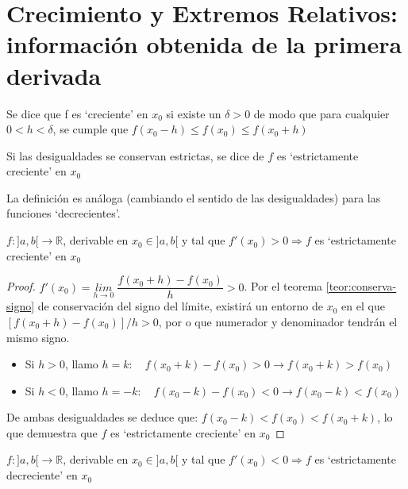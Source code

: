 \section[Crecimiento y Extremos Relativos: información obtenida de la primera derivada]{Crecimiento y Extremos Relativos: información obtenida de la primera derivada}

\label{ExtremosRelativos}

	\begin{defi}
		Se dice que f es `creciente' en $x_0$ si existe un $\delta>0$ de modo que para cualquier $0<h<\delta$, se cumple que $f(x_0-h)\le f(x_0) \le f(x_0+h)$
		
		Si las desigualdades se conservan estrictas, se dice de $f$ es `estrictamente creciente' en $x_0$
		
		La definición es análoga (cambiando el sentido de las desigualdades) para las funciones `decrecientes'.
	\end{defi}
	
	
		
	

	
	\begin{teor}
	$f:]a,b[\to \mathbb R$, derivable en $x_0 \in ]a,b[$	 y tal que $f'(x_0)>0 \Rightarrow f $ es `estrictamente creciente' en $x_0$
	\end{teor}
	
	\begin{proof}
		$f'(x_0)=\underset{h\to 0}{lim}\;{\dfrac {f(x_0+h)-f(x_0)}{h}}>0$. Por el teorema \ref{teor:conserva-signo} de conservación del signo del límite, existirá un entorno de $x_0$ en el que $[f(x_0+h)-f(x_0)]/h>0$, por o que numerador y denominador tendrán el mismo signo.
		\begin{itemize}
			\item Si $h>0$, llamo $h=k: \quad f(x_0+k)-f(x_0)>0 \to f(x_0+k)>f(x_0)$
			\item Si $h<0$, llamo $h=-k: \quad f(x_0-k)-f(x_0)<0 \to f(x_0-k)<f(x_0)$
		\end{itemize}
		
		De ambas desigualdades se deduce que: $f(x_0-k)<f(x_0)<f(x_0+k)$, lo que demuestra que $f$ es `estrictamente creciente' en $x_0$
	\end{proof}
	
	\begin{teor}\label{CS-extremos}
		$f:]a,b[\to \mathbb R$, derivable en $x_0 \in ]a,b[$	 y tal que $f'(x_0)<0 \Rightarrow f $ es `estrictamente decreciente' en $x_0$
	\end{teor}
	
